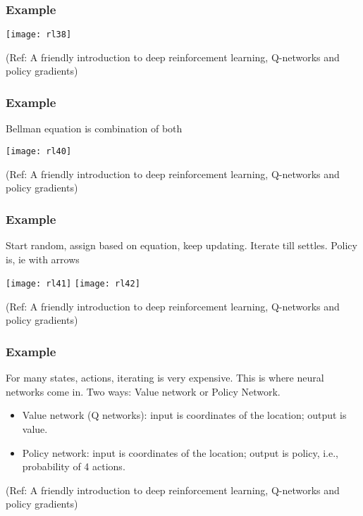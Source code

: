 \begin{frame}[fragile]\frametitle{Example}

\begin{center}
\texttt{[image: rl38]}
\end{center}

{\tiny (Ref: A friendly introduction to deep reinforcement learning, Q-networks and policy gradients)}

\end{frame}

\begin{frame}[fragile]\frametitle{Example}

Bellman equation is combination of both

\begin{center}
\texttt{[image: rl40]}
\end{center}

{\tiny (Ref: A friendly introduction to deep reinforcement learning, Q-networks and policy gradients)}

\end{frame}

\begin{frame}[fragile]\frametitle{Example}

Start random, assign based on equation, keep updating. Iterate till settles. Policy is, ie with arrows

\begin{center}
\texttt{[image: rl41]}
\texttt{[image: rl42]}

\end{center}

{\tiny (Ref: A friendly introduction to deep reinforcement learning, Q-networks and policy gradients)}

\end{frame}

\begin{frame}[fragile]\frametitle{Example}

For many states, actions, iterating is very expensive. This is where neural networks come in. Two ways: Value network or Policy Network.
\begin{itemize}
\item Value network (Q networks): input is coordinates of the location; output is value.
\item Policy network: input is coordinates of the location; output is policy, i.e., probability of 4 actions.
\end{itemize}


{\tiny (Ref: A friendly introduction to deep reinforcement learning, Q-networks and policy gradients)}

\end{frame}

